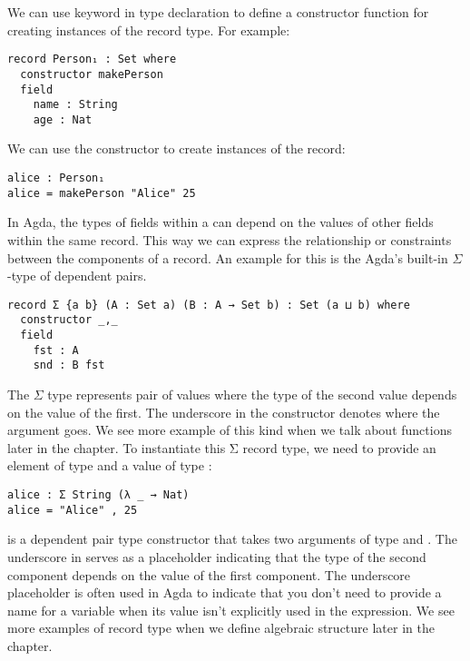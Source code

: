 We can use  keyword in  type declaration to
define a constructor function for creating instances of the record type. For
example:

\begin{verbatim}
record Person₁ : Set where
  constructor makePerson
  field
    name : String
    age : Nat
\end{verbatim}

We can use the constructor  to create instances of the 
record:

\begin{verbatim}
alice : Person₁
alice = makePerson "Alice" 25
\end{verbatim}

In Agda, the types of fields within a  can depend on the values
of other fields within the same record. This way we can express the relationship
or constraints between the components of a record. An example for this is the
Agda's built-in $\Sigma$-type of dependent pairs.

\begin{verbatim}
record Σ {a b} (A : Set a) (B : A → Set b) : Set (a ⊔ b) where
  constructor _,_
  field
    fst : A
    snd : B fst
\end{verbatim}

The $\Sigma$ type represents pair of values where the type of the second value
depends on the value of the first. The underscore in the constructor denotes
where the argument goes. We see more example of this kind when we talk about
functions later in the chapter. To instantiate this Σ record type, we need to
provide an element of type  and a value of type :

\begin{verbatim}
alice : Σ String (λ _ → Nat)
alice = "Alice" , 25
\end{verbatim}

 is a dependent pair type constructor that takes two arguments of type
 and . The underscore in 
serves as a placeholder indicating that the type of the second component depends
on the value of the first component. The underscore \inline{(_)} placeholder is
often used in Agda to indicate that you don't need to provide a name for a
variable when its value isn't explicitly used in the expression. We see more
examples of record type when we define algebraic structure later in the chapter. 

